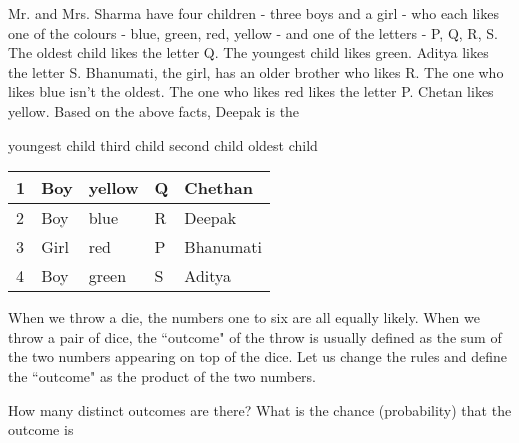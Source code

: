 \documentclass[12pt,answers]{exam}
\begin{document}
\begin{questions}
\question Mr. and Mrs. Sharma have four children - three boys and a girl - who each likes one of the colours - blue, green, red, yellow - and one of the letters - P, Q, R, S. The oldest child likes the letter Q. The youngest child likes green. Aditya likes the letter S. Bhanumati, the girl, has an older brother who likes R. The one who likes blue isn't the oldest. The one who likes red likes the letter P. Chetan likes yellow. Based on the above facts, Deepak is the
\begin{choices}
    \choice youngest child
    \choice third child
    \CorrectChoice second child
    \choice oldest child
\end{choices}
\begin{solution}
    \begin{tabular}{lllll}
        \hline
        1 & Boy	&	yellow	&	Q	&	Chethan	\\\hline
        2 & Boy	&	blue	&	R	&	Deepak	\\\hline
        3 & Girl	&	red	&	P	&	Bhanumati	\\\hline
        4 & Boy	&	green	&	S	&	Aditya	\\\hline
      \end{tabular}
\end{solution}
\question When we throw a die, the numbers one to six are all equally likely. When we throw a pair of dice, the ``outcome" of the throw is usually defined as the sum of the two numbers appearing on top of the dice. Let us change the rules and define the ``outcome" as the product of the two numbers.

How many distinct outcomes are there? What is the chance (probability) that the outcome is

\end{questions}
\end{document}
